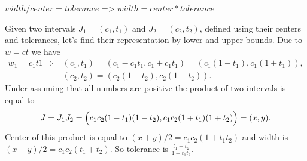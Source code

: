 \documentclass[a4paper,10pt]{article}
\begin{document}
$width/center = tolerance$ => $width = center * tolerance$

Given two intervals $J_1=(c_1, t_1)$ and $J_2=(c_2, t_2)$, defined using their centers and tolerances, let's find their representation by lower and upper bounds.
Due to $w = c  t$ we have
\begin{align*}
  w_1 = c_1  t1 \Rightarrow &(c_1, t_1) = (c_1 - c_1 t_1, c_1 + c_1t_1) = (c_1(1-t_1),c_1(1+t_1)),\\
  &(c_2, t_2) = (c_2(1-t_2),c_2(1+t_2)).
\end{align*}
Under assuming that all numbers are positive the product of two intervals is equal to 
\begin{equation*}
J=J_1J_2 = \Bigl(
c_1c_2(1-t_1)(1-t_2),
c_1c_2(1+t_1)(1+t_2)
\Bigr)=(x, y).
\end{equation*}
Center of this product is equal to $(x+y)/2=c_1c_2(1+t_1t_2)$ and width is $(x-y)/2=c_1c_2(t_1+t_2)$. So tolerance is $\frac{t_1+t_2}{1+t_1t_2}$.
\end{document}
